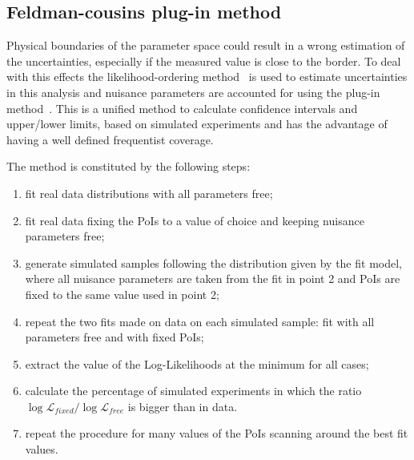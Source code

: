 \subsection{Feldman-cousins plug-in method}
\label{sec:FeldmanCousins}

Physical boundaries of the parameter space could result in a wrong estimation of the uncertainties,
especially if the measured value is close to the border. To deal with this effects the 
likelihood-ordering method~\cite{Feldman:1997qc} is used to estimate uncertainties in this analysis and
nuisance parameters are accounted for using the plug-in method~\cite{Karbach:2011uz}. This is a unified 
method to calculate confidence intervals and upper/lower limits, based on simulated experiments and has 
the advantage of having a well defined frequentist coverage.


The method is constituted by the following steps:
\begin{enumerate}
\item fit real data distributions with all parameters free;
\item fit real data fixing the PoIs to a value of choice and keeping nuisance parameters free;
\item generate simulated samples following the distribution given by the fit model,
where all nuisance parameters are taken from the fit in point 2 and PoIs are fixed to the same value used in point 2;
\item repeat the two fits made on data on each simulated sample: fit with all parameters free and with fixed PoIs;
\item extract the value of the Log-Likelihoods at the minimum for all cases;
\item calculate the percentage of simulated experiments in which the ratio
$\log\mathcal{L}_{fixed}/\log\mathcal{L}_{free}$ is bigger than in data.
\item repeat the procedure for many values of the PoIs scanning around the best fit values.
\end{enumerate}

